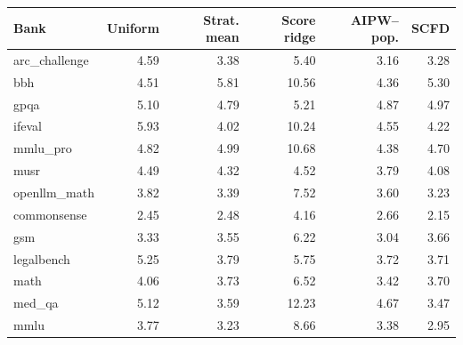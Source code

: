\begin{tabular}{lrrrrr}
\toprule
Bank & Uniform & Strat. mean & Score ridge & AIPW--pop. & SCFD \\
\midrule
arc\_challenge & 4.59 & 3.38 & 5.40 & 3.16 & 3.28 \\
bbh & 4.51 & 5.81 & 10.56 & 4.36 & 5.30 \\
gpqa & 5.10 & 4.79 & 5.21 & 4.87 & 4.97 \\
ifeval & 5.93 & 4.02 & 10.24 & 4.55 & 4.22 \\
mmlu\_pro & 4.82 & 4.99 & 10.68 & 4.38 & 4.70 \\
musr & 4.49 & 4.32 & 4.52 & 3.79 & 4.08 \\
openllm\_math & 3.82 & 3.39 & 7.52 & 3.60 & 3.23 \\
commonsense & 2.45 & 2.48 & 4.16 & 2.66 & 2.15 \\
gsm & 3.33 & 3.55 & 6.22 & 3.04 & 3.66 \\
legalbench & 5.25 & 3.79 & 5.75 & 3.72 & 3.71 \\
math & 4.06 & 3.73 & 6.52 & 3.42 & 3.70 \\
med\_qa & 5.12 & 3.59 & 12.23 & 4.67 & 3.47 \\
mmlu & 3.77 & 3.23 & 8.66 & 3.38 & 2.95 \\
\bottomrule
\end{tabular}
